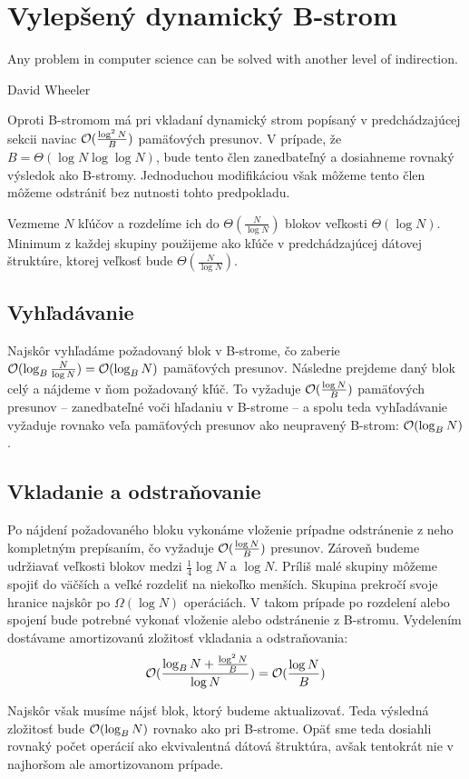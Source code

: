 \section{Vylepšený dynamický B-strom} \label{sec:dynamic-obliv-improved}
\epigraph{Any problem in computer science can be solved with another level of indirection.}{David Wheeler}
Oproti \aware B-stromom má pri vkladaní \obliv dynamický strom popísaný v predchádzajúcej sekcii naviac $\mathcal{O}(\frac{\log^2{N}}{B})$ pamäťových presunov. V prípade, že $B=\Theta(\log{N}\log\log{N})$, bude tento člen zanedbateľný a dosiahneme rovnaký výsledok ako \aware B-stromy. Jednoduchou modifikáciou však môžeme tento člen môžeme odstrániť bez nutnosti tohto predpokladu.

Vezmeme $N$ kľúčov a rozdelíme ich do $\Theta(\frac{N}{\log{N}})$ blokov veľkosti $\Theta(\log{N})$. Minimum z každej skupiny použijeme ako kľúče v predchádzajúcej dátovej štruktúre, ktorej veľkosť bude $\Theta(\frac{N}{\log{N}})$.

\subsection{Vyhľadávanie}
Najskôr vyhľadáme požadovaný blok v B-strome, čo zaberie $\mathcal{O}(\log_B{\frac{N}{\log{N}}}) = \mathcal{O}(\log_B{N})$ pamäťových presunov. Následne prejdeme daný blok celý a nájdeme v ňom požadovaný kľúč. To vyžaduje $\mathcal{O}(\frac{\log{N}}{B})$ pamäťových presunov -- zanedbateľné voči hľadaniu v B-strome -- a spolu teda vyhľadávanie vyžaduje rovnako veľa pamäťových presunov ako neupravený B-strom: $\mathcal{O}(\log_B{N})$.

\subsection{Vkladanie a odstraňovanie}
Po nájdení požadovaného bloku vykonáme vloženie prípadne odstránenie z neho kompletným prepísaním, čo vyžaduje $\mathcal{O}(\frac{\log{N}}{B})$ presunov. Zároveň budeme udržiavať veľkosti blokov medzi $\frac{1}{4}\log{N}$ a $\log{N}$. Príliš malé skupiny môžeme spojiť do väčších a veľké rozdeliť na niekoľko menších. Skupina prekročí svoje hranice najskôr po $\Omega(\log{N})$ operáciách. V takom prípade po rozdelení alebo spojení bude potrebné vykonať vloženie alebo odstránenie z B-stromu. Vydelením dostávame amortizovanú zložitosť vkladania a odstraňovania:
\[
\mathcal{O}(\frac{\log_B{N} + \frac{\log^2{N}}{B}}{\log{N}}) = \mathcal{O}(\frac{\log{N}}{B})
\]

Najskôr však musíme nájsť blok, ktorý budeme aktualizovať. Teda výsledná zložitosť bude $\mathcal{O}(\log_B{N})$ rovnako ako pri \aware B-strome. Opäť sme teda dosiahli rovnaký počet operácií ako ekvivalentná \aware dátová štruktúra, avšak tentokrát nie v najhoršom ale  amortizovanom prípade.

